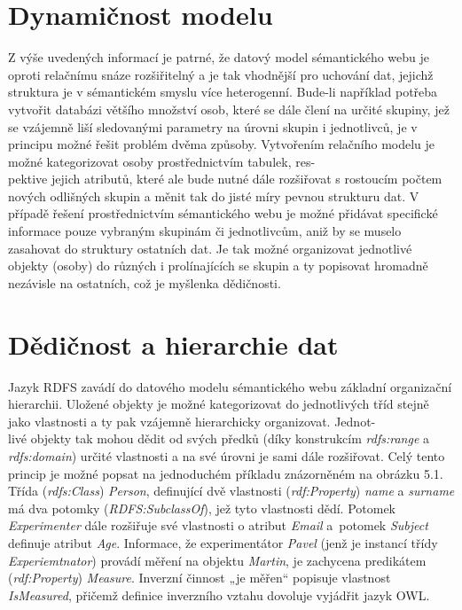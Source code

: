 \documentclass{projekt}
\begin{document}
\section{Dynamičnost modelu}
\hspace{0.65cm}Z výše uvedených informací je patrné, že datový model sémantického webu je oproti relačnímu snáze rozšiřitelný a je tak vhodnější pro uchování dat, jejichž struktura je v sémantickém smyslu více heterogenní. Bude-li například potřeba vytvořit databázi většího množství osob, které se dále člení na určité skupiny, jež se vzájemně liší sledovanými parametry na úrovni skupin i jednotlivců, je v principu možné řešit problém dvěma způsoby. Vytvořením relačního modelu je možné kategorizovat osoby prostřednictvím tabulek, res-\\pektive jejich  atributů, které ale bude nutné dále rozšiřovat s rostoucím počtem nových odlišných skupin a měnit tak do jisté míry pevnou strukturu dat. V případě řešení prostřednictvím sémantického webu je možné přidávat specifické informace pouze vybraným skupinám či jednotlivcům, aniž by se muselo zasahovat do struktury ostatních dat. Je tak možné organizovat jednotlivé objekty (osoby) do různých i prolínajících se skupin a ty popisovat hromadně nezávisle na ostatních, což je myšlenka dědičnosti.

\section{Dědičnost a hierarchie dat}
\hspace{0.65cm}Jazyk RDFS zavádí do datového modelu sémantického webu základní organizační hierarchii. Uložené objekty je možné kategorizovat do jednotlivých tříd stejně jako vlastnosti a ty pak vzájemně hierarchicky organizovat. Jednot-\\livé objekty tak mohou dědit od svých předků (díky konstrukcím {\it rdfs:range} a {\it rdfs:domain}) určité vlastnosti a na své úrovni je sami dále rozšiřovat. Celý tento princip je možné popsat na jednoduchém příkladu znázorněném na obrázku 5.1. Třída ({\it rdfs:Class}) {\it Person}, definující dvě vlastnosti ({\it rdf:Property}) {\it name} a {\it surname} má dva potomky ({\it RDFS:SubclassOf}), jež tyto vlastnosti dědí. Potomek {\it Experimenter} dále rozšiřuje své vlastnosti o atribut {\it Email} a~potomek {\it Subject} definuje atribut {\it Age}. Informace, že experimentátor {\it Pavel} (jenž je instancí třídy {\it Experiemtnator}) provádí měření na objektu {\it Martin}, je zachycena predikátem ({\it rdf:Property}) {\it Measure}. Inverzní činnost „je měřen“ popisuje vlastnost {\it IsMeasured}, přičemž definice inverzního vztahu dovoluje vyjádřit jazyk OWL.
\end{document}
